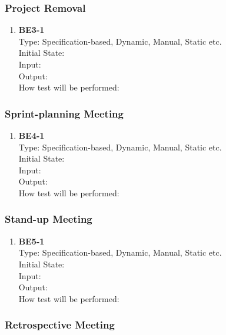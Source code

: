 \documentclass[12pt, titlepage]{article}
\begin{document}
\subsubsection{Project Removal}

\begin{enumerate}
    \item{\textbf{BE3-1}}\\
    Type: Specification-based, Dynamic, Manual, Static etc.\\
    Initial State: \\
    Input: \\
    Output: \\
    How test will be performed: \\
\end{enumerate}

\subsubsection{Sprint-planning Meeting}

\begin{enumerate}
    \item{\textbf{BE4-1}}\\
    Type: Specification-based, Dynamic, Manual, Static etc.\\
    Initial State: \\
    Input: \\
    Output: \\
    How test will be performed: \\
\end{enumerate}

\subsubsection{Stand-up Meeting}

\begin{enumerate}
    \item{\textbf{BE5-1}}\\
    Type: Specification-based, Dynamic, Manual, Static etc.\\
    Initial State: \\
    Input: \\
    Output: \\
    How test will be performed: \\
\end{enumerate}

\subsubsection{Retrospective Meeting}
\end{document}
